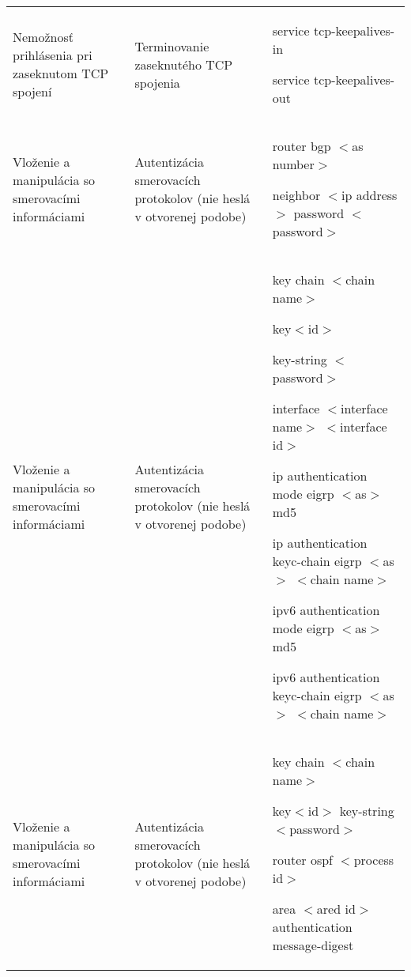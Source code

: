 \begin{longtable}[!htbp]{|L{10em}L{10em}>{\selectfont}L{34em}|}
	
	
	
	 Nemožnosť prihlásenia pri zaseknutom TCP spojení	&Terminovanie zaseknutého TCP spojenia	&service tcp-keepalives-in
	
	service tcp-keepalives-out\\
	
	
	
	
	Vloženie a manipulácia so smerovacími informáciami	&Autentizácia smerovacích protokolov (nie heslá v otvorenej podobe)	&router bgp $<$as number$>$
	
	\hspace{0.5em}neighbor $<$ip address$>$ password $<$password$>$  \\
	
	
	
	
	 Vloženie a manipulácia so smerovacími informáciami	&Autentizácia smerovacích protokolov (nie heslá v otvorenej podobe)	&key chain $<$chain name$>$
	
	\hspace{0.5em}key$<$id$>$
	
	\hspace{1em}key-string $<$password$>$
	
	interface $<$interface name$>$ $<$interface id$>$
	
	\hspace{0.5em}ip authentication mode eigrp $<$as$>$ md5
	
	\hspace{0.5em}ip authentication keyc-chain eigrp $<$as$>$ $<$chain name$>$
	
	\hspace{0.5em}ipv6 authentication mode eigrp $<$as$>$ md5
	
	\hspace{0.5em}ipv6 authentication keyc-chain eigrp $<$as$>$ $<$chain name$>$\\
	
	
	
	
	Vloženie a manipulácia so smerovacími informáciami	&Autentizácia smerovacích protokolov (nie heslá v otvorenej podobe)	&key chain $<$chain name$>$
	
	\hspace{0.5em}key$<$id$>$
	\hspace{1em}key-string $<$password$>$
	
	router ospf $<$process id$>$
	
	\hspace{0.5em}area $<$ared id$>$ authentication message-digest
	

\end{longtable}
